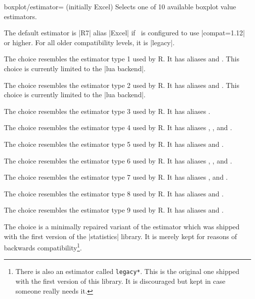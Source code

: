 \begin{pgfplotskey}{boxplot/estimator= (initially Excel)}
	Selects one of 10 available boxplot value estimators.

	The default estimator is |R7| alias |Excel| if \PGFPlots\ is configured to use |compat=1.12| or higher. For all older compatibility levels, it is |legacy|.

	The choice  resembles the estimator type 1 used by R. It has aliases  and . This choice is currently limited to the |lua backend|.

	The choice  resembles the estimator type 2 used by R. It has aliases  and . This choice is currently limited to the |lua backend|.

	The choice  resembles the estimator type 3 used by R. It has aliases .

	The choice  resembles the estimator type 4 used by R. It has aliases , , and .

	The choice  resembles the estimator type 5 used by R. It has aliases  and .

	The choice  resembles the estimator type 6 used by R. It has aliases , , and .

	The choice  resembles the estimator type 7 used by R. It has aliases ,  and .

	The choice  resembles the estimator type 8 used by R. It has aliases  and .

	The choice  resembles the estimator type 9 used by R. It has aliases  and .

	The choice  is a minimally repaired variant of the estimator which was shipped with the first version of the |statistics| library. It is merely kept for reasons of backwards compatibility\footnote{There is also an estimator called \texttt{legacy*}. This is the original one shipped with the first version of this library. It is discouraged but kept in case someone really needs it.}.
\end{pgfplotskey}

